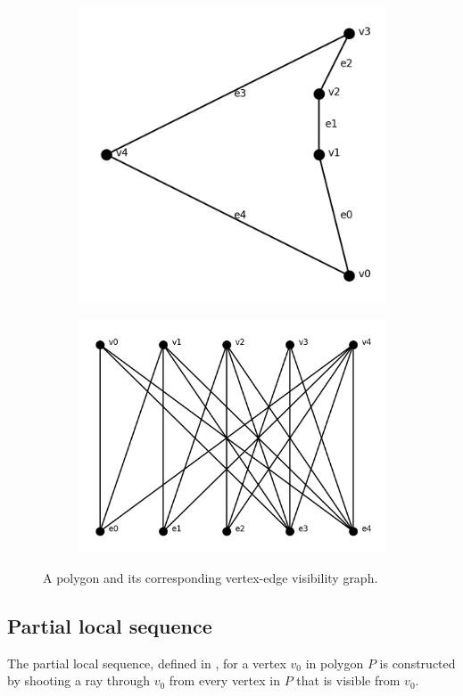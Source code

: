 \documentclass[]{article}  %
\begin{document}
\begin{figure}
\centering
\begin{subfigure}{0.25\textwidth}
  \includegraphics[width=0.6\linewidth]{figures/concave_pent.png}
  \label{fig:c_p}
\end{subfigure}%
\begin{subfigure}{0.25\textwidth}
  \includegraphics[width=0.8\linewidth]{figures/viz_edge_graph.png}
\end{subfigure}
\caption{A polygon and its corresponding vertex-edge visibility graph.\label{fig:veg}}

\end{figure}


\subsection{Partial local sequence}

The partial local sequence, defined in \cite{rourke_viz}, 
for a vertex $v_0$ in polygon $P$ is constructed 
by shooting a ray through $v_0$ from every vertex in $P$ that is visible from
$v_0$.
\end{document}
